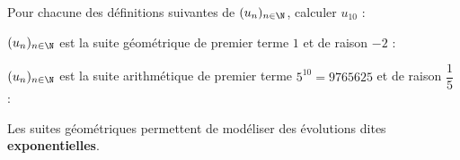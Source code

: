 \documentclass{article}
\begin{document}
\begin{example}
Pour chacune des définitions suivantes de $(u_n)_{n \in \N}$, calculer $u_{10}$ :
\begin{enumquestions}
\item $(u_n)_{n \in \N}$ est la suite géométrique de premier terme $1$ et de raison $-2$ : \answersline
\item $(u_n)_{n \in \N}$ est la suite arithmétique de premier terme $5^{10} = \num{9765625}$ et de raison $\dfrac{1}{5}$ : \answersline
\end{enumquestions}
\end{example}
\begin{tcolorbox}
\begin{definition}
Les suites géométriques permettent de modéliser des évolutions dites \textbf{exponentielles}.         
\end{definition}
\end{tcolorbox}
\end{document}
